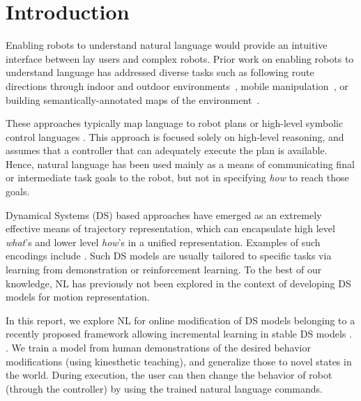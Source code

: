 \section{Introduction}
\label{secIntroduction}


Enabling robots to understand natural language would provide an intuitive interface between lay users and complex robots.
Prior work on enabling robots to understand language has addressed diverse tasks such as following route directions through indoor and outdoor environments~\cite{macmahon06, kollar10, matuszek12a, duvallet13, boularias15}, mobile manipulation~\cite{tellex11, howard14a}, or building semantically-annotated maps of the environment~\cite{walter13}.

These approaches typically map language to robot plans or high-level symbolic control languages . This approach is focused solely on high-level reasoning, and assumes that a controller that can adequately execute the plan is available. Hence, natural language has been used mainly as a means of communicating final or intermediate task goals to the robot, but not in specifying \emph{how} to reach those goals.

Dynamical Systems (DS) based approaches have emerged as an extremely effective means of trajectory representation, which can encapsulate high level \emph{what}'s and lower level \emph{how}'s in a unified representation. Examples of such encodings include . Such DS models are usually tailored to specific tasks via learning from demonstration or reinforcement learning. To the best of our knowledge, NL has previously not been explored in the context of developing DS models for motion representation.

In this report, we explore NL for online modification of DS models belonging to a recently proposed framework allowing incremental learning in stable DS models . . We train a model from human demonstrations of the desired behavior modifications (using kinesthetic teaching), and generalize those to novel states in the world.
 During execution, the user can then change the behavior of robot (through the controller) by using the trained natural language commands.








